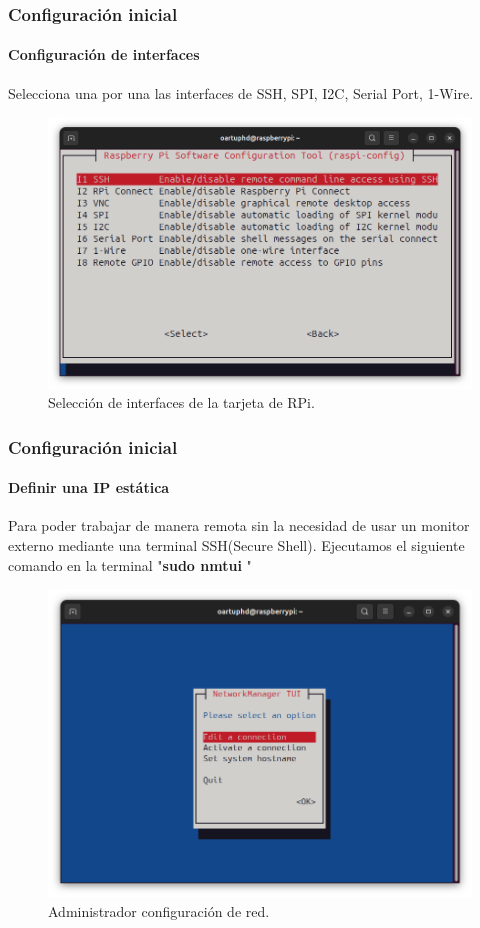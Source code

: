 \documentclass{beamer}
\begin{document}
		\begin{frame}
		\frametitle{Configuración inicial}
		\framesubtitle{Configuración de interfaces}
		Selecciona una por una las interfaces de SSH, SPI, I2C, Serial Port, 1-Wire.
		\begin{figure}
			\includegraphics[scale=0.3]{configrpi2.png}
			\caption{Selección de interfaces de la tarjeta de RPi. }
		\end{figure}
		
	\end{frame}
	
	\begin{frame}
		\frametitle{Configuración inicial}
		\framesubtitle{Definir una IP estática}
		Para poder trabajar de manera remota sin la necesidad de usar un monitor externo mediante una terminal SSH(Secure Shell). Ejecutamos el siguiente comando en la terminal "\textbf{sudo nmtui} "
		
		\begin{figure}
			\includegraphics[scale=0.25]{rpissh.png}
			\caption{Administrador configuración de red.}
		\end{figure}
	\end{frame}
	
\end{document}
